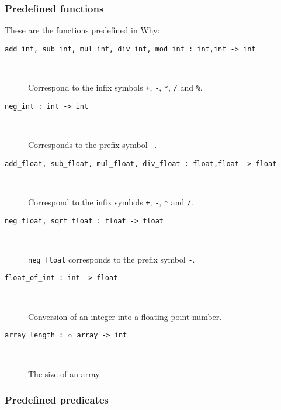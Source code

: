 \documentclass[a4paper,12pt]{report}
\newcommand{\why}{\textsf{Why}}
\begin{document}
\subsubsection{Predefined functions}

These are the functions predefined in \why:
\begin{description}
\item[\texttt{add\_int, sub\_int, mul\_int, div\_int, mod\_int :
    int,int -> int}] ~\par
  Correspond to the infix symbols
  \texttt{+}, \texttt{-}, \texttt{*}, \texttt{/} and \texttt{\%}.
\item[\texttt{neg\_int : int -> int}] ~\par
  Corresponds to the prefix symbol \texttt{-}.
\item[\texttt{add\_float, sub\_float, mul\_float, div\_float :
    float,float -> float}] ~\par
  Correspond to the infix symbols
  \texttt{+}, \texttt{-}, \texttt{*} and \texttt{/}.
\item[\texttt{neg\_float, sqrt\_float : float -> float}] ~\par
  \texttt{neg\_float} corresponds to the prefix symbol \texttt{-}.
\item[\texttt{float\_of\_int : int -> float}] ~\par
  Conversion of an integer into a floating point number.
\item[\texttt{array\_length : $\alpha$ array -> int}] ~\par
  The size of an array.
\end{description}

\subsubsection{Predefined predicates}
\end{document}
